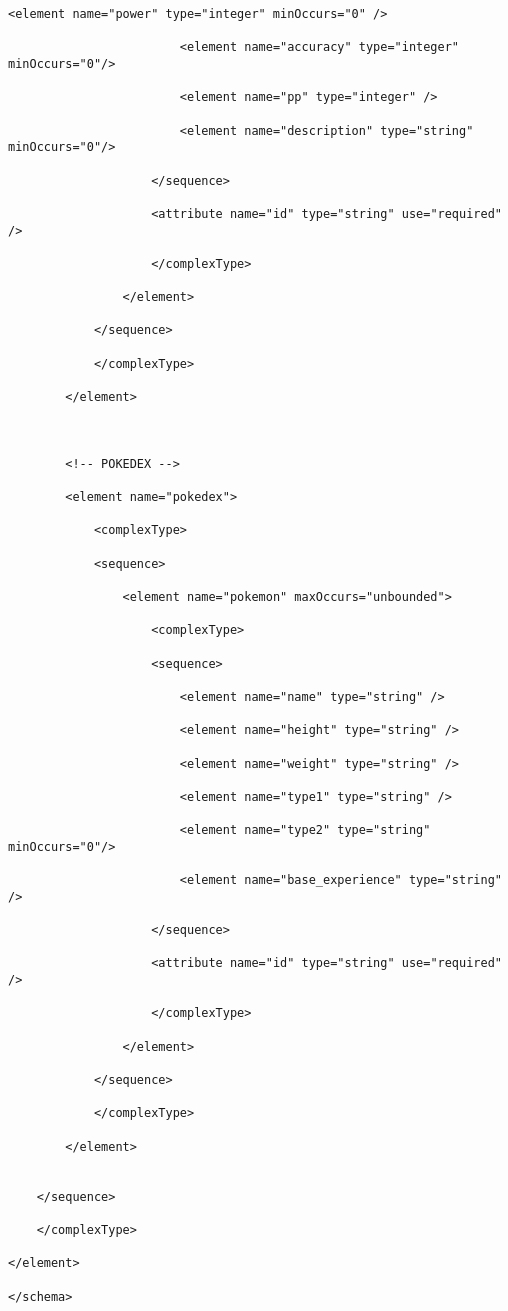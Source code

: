 \begin{lstlisting}[style=XML]
                        <element name="power" type="integer" minOccurs="0" />

                        <element name="accuracy" type="integer" minOccurs="0"/>

                        <element name="pp" type="integer" />

                        <element name="description" type="string" minOccurs="0"/>

                    </sequence>

                    <attribute name="id" type="string" use="required" />

                    </complexType>

                </element>

            </sequence>

            </complexType>

        </element>

        

        <!-- POKEDEX -->

        <element name="pokedex">

            <complexType>

            <sequence>

                <element name="pokemon" maxOccurs="unbounded">

                    <complexType>

                    <sequence>

                        <element name="name" type="string" />

                        <element name="height" type="string" />

                        <element name="weight" type="string" />

                        <element name="type1" type="string" />

                        <element name="type2" type="string" minOccurs="0"/>

                        <element name="base_experience" type="string" />

                    </sequence>

                    <attribute name="id" type="string" use="required" />

                    </complexType>

                </element>

            </sequence>

            </complexType>

        </element>


    </sequence>

    </complexType>

</element>

</schema>

\end{lstlisting}
